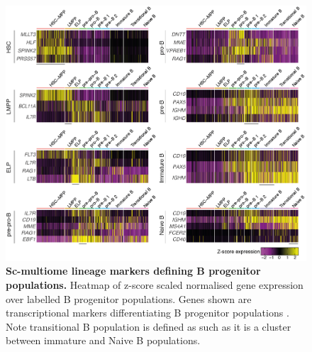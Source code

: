 \begin{figure}[p]
    \centering
    \includegraphics[width=\textwidth,height=\textheight,keepaspectratio]{figures/appendix/app_multiome-lineage-markers.png}
    \caption[{Sc-multiome lineage markers defining B progenitor populations.}]
    {\textbf{Sc-multiome lineage markers defining B progenitor populations.} 
    Heatmap of z-score scaled normalised gene expression over labelled B progenitor populations. Genes shown are transcriptional markers differentiating B progenitor populations \citep{jardine_blood_2021, suo_mapping_2022}. Note transitional B population is defined as such as it is a cluster between immature and Naive B populations.
    }
    \label{fig:app_multiome-lineage-markers}
\end{figure}
\clearpage

